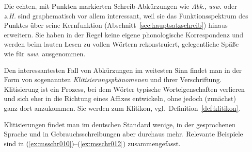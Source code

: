 Die echten, mit Punkten markierten Schreib-Abkürzungen wie \textit{Abk.}, \textit{usw.} oder \textit{z.H.} sind graphematisch vor allem interessant, weil sie das Funktionsspektrum des Punktes über seine Kernfunktion (Abschnitt~\ref{sec:hauptsatzschreib}) hinaus erweitern.
Sie haben in der Regel keine eigene phonologische Korrespondenz und werden beim lauten Lesen zu vollen Wörtern rekonstruiert, gelegentliche Späße wie \zB \textipa{[Puz@v@]} für \textit{usw.} ausgenommen.

Den interessantesten Fall von Abkürzungen im weitesten Sinn findet man in der Form von sogenannten \textit{Klitisierungsphänomenen} und ihrer Verschriftung.
Klitisierung ist ein Prozess, bei dem Wörter typische Worteigenschaften verlieren und sich eher in die Richtung eines Affixes entwickeln, ohne jedoch (zunächst) ganz dort anzukommen.
Sie werden zum Klitikon, vgl.\ Definition~\ref{def:klitikon}.


Klitisierungen findet man im deutschen Standard wenige, in der gesprochenen Sprache und in Gebrauchsschreibungen aber durchaus mehr.
Relevante Beispiele sind in (\ref{ex:msschr010})--(\ref{ex:msschr012}) zusammengefasst.

\begin{exe}
  \ex\label{ex:msschr011} 
  \begin{xlist}
  \end{xlist}
  \ex\label{ex:msschr012} 
  \begin{xlist}
  \end{xlist}
\end{exe}

